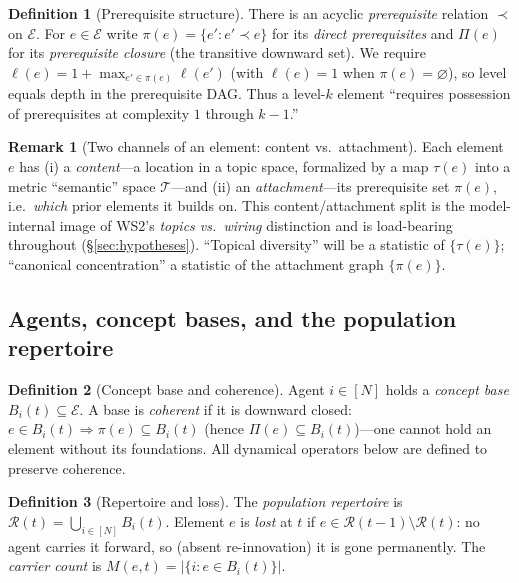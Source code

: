 \documentclass[11pt,letterpaper]{article}
\theoremstyle{definition}
\newtheorem{definition}{Definition}[section]
\newtheorem{remark}{Remark}[section]
\theoremstyle{plain}
\newcommand{\E}{\mathcal{E}}
\newcommand{\R}{\mathcal{R}}
\newcommand{\pre}{\pi}
\newcommand{\clo}{\Pi}
\newcommand{\card}[1]{\lvert #1 \rvert}
\begin{document}
\begin{definition}[Prerequisite structure]
There is an acyclic \emph{prerequisite} relation $\prec$ on $\E$. For $e\in\E$
write $\pre(e) = \{e' : e' \prec e\}$ for its \emph{direct prerequisites} and
$\clo(e)$ for its \emph{prerequisite closure} (the transitive downward set). We
require $\ell(e) = 1 + \max_{e'\in\pre(e)}\ell(e')$ (with $\ell(e)=1$ when
$\pre(e)=\varnothing$), so level equals depth in the prerequisite DAG. Thus a
level-$k$ element ``requires possession of prerequisites at complexity $1$
through $k{-}1$.''
\end{definition}

\begin{remark}[Two channels of an element: content vs.\ attachment]\label{rem:twochannels}
Each element $e$ has (i) a \emph{content}---a location in a topic space,
formalized by a map $\tau(e)$ into a metric ``semantic'' space
$\mathcal{T}$---and (ii) an \emph{attachment}---its prerequisite set $\pre(e)$,
i.e.\ \emph{which} prior elements it builds on. This content/attachment split is
the model-internal image of WS2's \emph{topics vs.\ wiring} distinction and is
load-bearing throughout (\S\ref{sec:hypotheses}). ``Topical diversity'' will be a
statistic of $\{\tau(e)\}$; ``canonical concentration'' a statistic of the
attachment graph $\{\pre(e)\}$.
\end{remark}

\subsection{Agents, concept bases, and the population repertoire}

\begin{definition}[Concept base and coherence]
Agent $i\in[N]$ holds a \emph{concept base} $B_i(t)\subseteq\E$. A base is
\emph{coherent} if it is downward closed: $e\in B_i(t)\Rightarrow
\pre(e)\subseteq B_i(t)$ (hence $\clo(e)\subseteq B_i(t)$)---one cannot hold an
element without its foundations. All dynamical operators below are defined to
preserve coherence.
\end{definition}

\begin{definition}[Repertoire and loss]
The \emph{population repertoire} is $\R(t) = \bigcup_{i\in[N]} B_i(t)$. Element
$e$ is \emph{lost} at $t$ if $e\in\R(t{-}1)\setminus\R(t)$: no agent carries it
forward, so (absent re-innovation) it is gone permanently. The \emph{carrier
count} is $M(e,t) = \card{\{i : e\in B_i(t)\}}$.
\end{definition}
\end{document}
